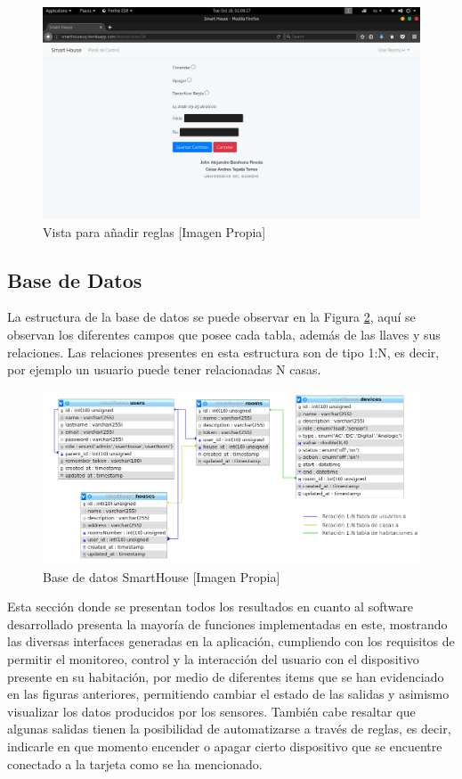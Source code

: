 \begin{figure}[H]
	\centering
	\caption{Vista para añadir reglas [Imagen Propia]}
	\label{fig:rulesview}
	\includegraphics[width=0.6\linewidth]{Imagenes/rules_view}
\end{figure}

\subsection{Base de Datos}

La estructura de la base de datos se puede observar en la Figura \ref{fig:db}, aquí se observan los diferentes campos que posee cada tabla, además de las llaves y sus relaciones. Las relaciones presentes en esta estructura son de tipo 1:N, es decir, por ejemplo un usuario puede tener relacionadas N casas.\\

\begin{figure}[H]
\centering
\caption{Base de datos SmartHouse [Imagen Propia]}
\label{fig:db}
\includegraphics[width=0.75\linewidth]{Imagenes/DB}
\end{figure}

Esta sección donde se presentan todos los resultados en cuanto al software desarrollado presenta la mayoría de funciones implementadas en este, mostrando las diversas interfaces generadas en la aplicación, cumpliendo con los requisitos de permitir el monitoreo, control y la interacción del usuario con el dispositivo presente en su habitación, por medio de diferentes items que se han evidenciado en las figuras anteriores, permitiendo cambiar el estado de las salidas y asimismo visualizar los datos producidos por los sensores. También cabe resaltar que algunas salidas tienen la posibilidad de automatizarse a través de reglas, es decir, indicarle en que momento encender o apagar cierto dispositivo que se encuentre conectado a la tarjeta como se ha mencionado.\\


